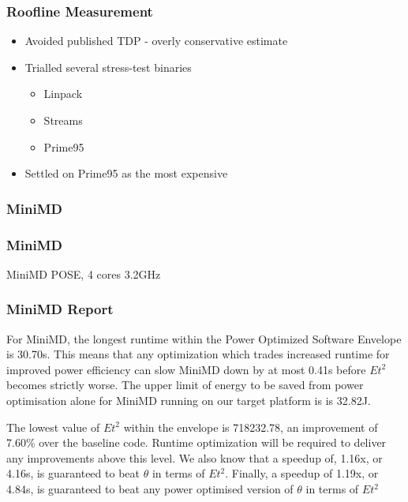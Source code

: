 \documentclass{beamer}
\begin{document}
  \begin{frame}
    \frametitle{Roofline Measurement}
    \begin{itemize}
      \item Avoided published TDP - overly conservative estimate
      \item Trialled several stress-test binaries
      \begin{itemize}
        \item Linpack
        \item Streams
        \item Prime95
      \end{itemize}
      \item Settled on Prime95 as the most expensive
    \end{itemize}
  \end{frame}

  \begin{frame}
    \frametitle{MiniMD}
    \begin{figure}
    \providecommand{\plotwidth}{.8\linewidth}
    
    \end{figure}
  \end{frame}
  \begin{frame}
    \frametitle{MiniMD}
    \begin{table}
    
    \caption{MiniMD POSE, 4 cores 3.2GHz}
    \end{table} 
  \end{frame}

  \begin{frame}
    \frametitle{MiniMD Report}
    For MiniMD, the longest runtime within the Power Optimized Software Envelope is 30.70s.
    This means that any optimization which trades increased runtime for improved power efficiency can slow MiniMD down by at most 0.41s before $Et^2$ becomes strictly worse.
    The upper limit of energy to be saved from power optimisation alone for MiniMD running on our target platform is is 32.82J.

    The lowest value of $Et^2$ within the envelope is 718232.78, an improvement of 7.60\% over the baseline code. 
    Runtime optimization will be required to deliver any improvements above this level.
    We also know that a speedup of, 1.16x, or 4.16s, is guaranteed to beat $\theta$ in terms of $Et^2$.
    Finally, a speedup of 1.19x, or 4.84s, is guaranteed to beat any power optimised version of $\theta$ in terms of $Et^2$
  \end{frame}
\end{document}
